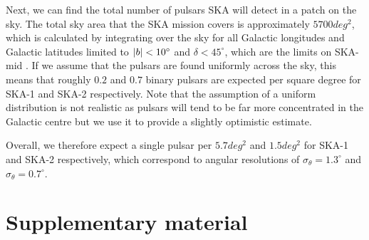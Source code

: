 Next, we can find the total number of pulsars SKA will detect in a patch on the sky. The total sky area that the SKA mission covers is approximately $5700 \unit{deg^2}$, which is calculated by integrating over the sky for all Galactic longitudes and Galactic latitudes limited to $\abs{b} < 10^\circ$ and $\delta < 45^\circ$, which are the limits on SKA-mid \citep{Keane+2015}. If we assume that the pulsars are found uniformly across the sky, this means that roughly $0.2$ and $0.7$ binary pulsars are expected per square degree for SKA-1 and SKA-2 respectively. Note that the assumption of a uniform distribution is not realistic as pulsars will tend to be far more concentrated in the Galactic centre but we use it to provide a slightly optimistic estimate.

Overall, we therefore expect a single pulsar per $5.7 \unit{deg^2}$ and $1.5 \unit{deg^2}$ for SKA-1 and SKA-2 respectively, which correspond to angular resolutions of $\sigma_\theta = 1.3^\circ$ and $\sigma_\theta = 0.7^\circ$.

\clearpage
\onecolumngrid

\section{Supplementary material}


